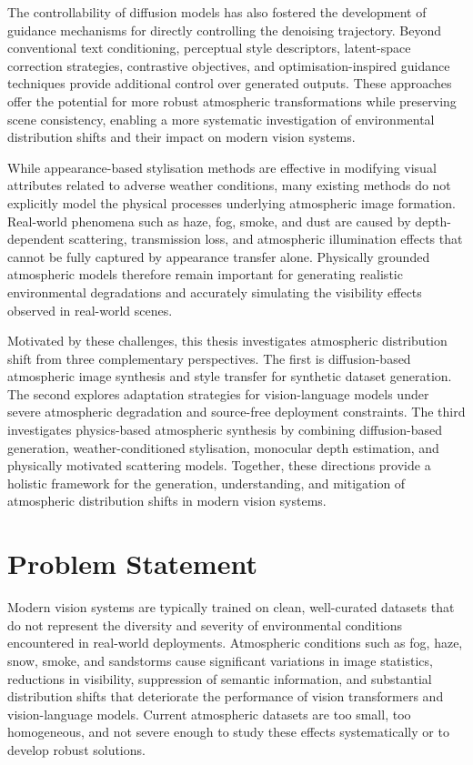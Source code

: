 \noindent The controllability of diffusion models has also fostered the development of guidance mechanisms for directly controlling the denoising trajectory. Beyond conventional text conditioning, perceptual style descriptors, latent-space correction strategies, contrastive objectives, and optimisation-inspired guidance techniques provide additional control over generated outputs. These approaches offer the potential for more robust atmospheric transformations while preserving scene consistency, enabling a more systematic investigation of environmental distribution shifts and their impact on modern vision systems.

\noindent While appearance-based stylisation methods are effective in modifying visual attributes related to adverse weather conditions, many existing methods do not explicitly model the physical processes underlying atmospheric image formation. Real-world phenomena such as haze, fog, smoke, and dust are caused by depth-dependent scattering, transmission loss, and atmospheric illumination effects that cannot be fully captured by appearance transfer alone. Physically grounded atmospheric models therefore remain important for generating realistic environmental degradations and accurately simulating the visibility effects observed in real-world scenes.

\noindent Motivated by these challenges, this thesis investigates atmospheric distribution shift from three complementary perspectives. The first is diffusion-based atmospheric image synthesis and style transfer for synthetic dataset generation. The second explores adaptation strategies for vision-language models under severe atmospheric degradation and source-free deployment constraints. The third investigates physics-based atmospheric synthesis by combining diffusion-based generation, weather-conditioned stylisation, monocular depth estimation, and physically motivated scattering models. Together, these directions provide a holistic framework for the generation, understanding, and mitigation of atmospheric distribution shifts in modern vision systems.

\section{Problem Statement}
\label{sec:problem_statement}

\noindent Modern vision systems are typically trained on clean, well-curated datasets that do not represent the diversity and severity of environmental conditions encountered in real-world deployments. Atmospheric conditions such as fog, haze, snow, smoke, and sandstorms cause significant variations in image statistics, reductions in visibility, suppression of semantic information, and substantial distribution shifts that deteriorate the performance of vision transformers and vision-language models. Current atmospheric datasets are too small, too homogeneous, and not severe enough to study these effects systematically or to develop robust solutions.

